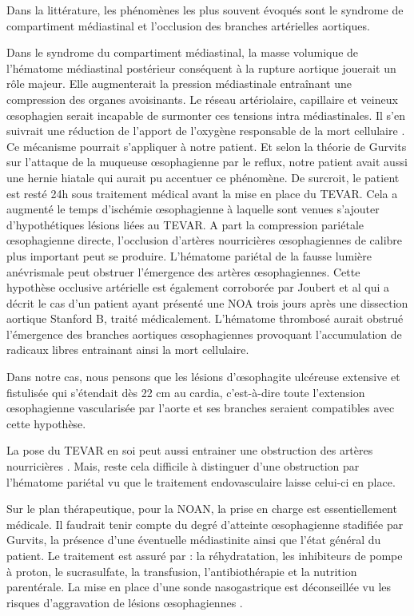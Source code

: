\documentclass[./tfe.tex]{subfiles}
\begin{document}
Dans la littérature, les phénomènes les plus souvent évoqués sont le syndrome de compartiment médiastinal et l’occlusion des branches artérielles aortiques.

Dans le syndrome du compartiment médiastinal, la masse volumique de l'hématome médiastinal postérieur conséquent à la rupture aortique jouerait un rôle majeur. Elle augmenterait la pression médiastinale entraînant une compression des organes avoisinants. Le réseau artériolaire, capillaire et veineux œsophagien serait incapable de surmonter ces tensions intra médiastinales. Il s’en suivrait une réduction de l’apport de l’oxygène responsable de la mort cellulaire\cite{czerny_new_2014} . Ce mécanisme pourrait s’appliquer à notre patient. Et selon la théorie de Gurvits sur l’attaque de la muqueuse œsophagienne par le reflux, notre patient avait aussi une hernie hiatale qui aurait pu accentuer ce phénomène.
De surcroit, le patient est resté 24h sous traitement médical avant la mise en place du TEVAR. Cela a augmenté le temps d’ischémie œsophagienne à laquelle sont venues s’ajouter d’hypothétiques lésions liées au TEVAR.
A part la compression pariétale œsophagienne directe, l’occlusion d’artères nourricières œsophagiennes de calibre plus important peut se produire. L’hématome pariétal de la fausse lumière anévrismale peut obstruer l’émergence des artères œsophagiennes\cite{minatoya_transmural_2000, porcu_esophageal_2005}. Cette hypothèse occlusive artérielle est également corroborée par Joubert et al \cite{joubert_successful_2016} qui a décrit le cas d'un patient ayant présenté une NOA trois jours après une dissection aortique Stanford B, traité médicalement. L'hématome thrombosé aurait obstrué l’émergence des branches aortiques œsophagiennes provoquant l'accumulation de radicaux libres entrainant ainsi la mort cellulaire.

Dans notre cas, nous pensons que les lésions d’œsophagite ulcéreuse extensive et fistulisée qui s'étendait dès 22 cm au cardia, c'est-à-dire toute l'extension œsophagienne vascularisée par l'aorte et ses branches seraient compatibles avec cette hypothèse.

La pose du TEVAR en soi peut aussi entrainer une obstruction des artères nourricières \cite{porcu_esophageal_2005, rascanu_osophagusnekrose_2009}. Mais, reste cela difficile à distinguer d’une obstruction par l’hématome pariétal vu que le traitement endovasculaire laisse celui-ci en place.

Sur le plan thérapeutique, pour la NOAN, la prise en charge est essentiellement médicale. Il faudrait tenir compte du degré d’atteinte œsophagienne stadifiée par Gurvits, la présence d’une éventuelle médiastinite ainsi que l’état général du patient. Le traitement est assuré par \cite{gurvits_acute_2007, abdullah_clinical_2019} : la réhydratation, les inhibiteurs de pompe à proton, le sucrasulfate, la transfusion, l’antibiothérapie et la nutrition parentérale. La mise en place d’une sonde nasogastrique est déconseillée vu les risques d’aggravation de lésions œsophagiennes \cite{gurvits_acute_2007}.
\end{document}
